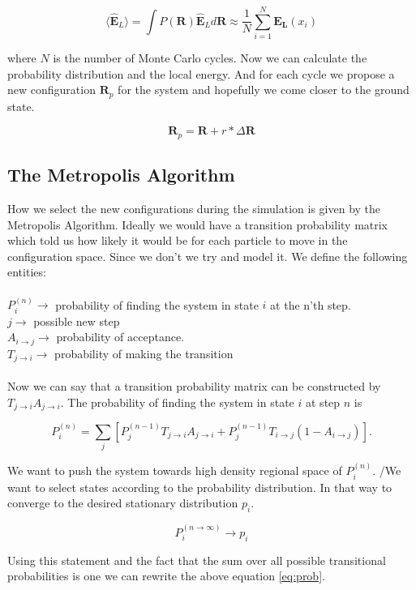 $$\langle \widehat{\mathbf{E}}_L\rangle = \int P(\mathbf{R}) \widehat{\mathbf{E}}_L d\mathbf{R} \approx \frac{1}{N} \sum_{i = 1}^N \mathbf{E_L}(x_i)$$

where $N$ is the number of Monte Carlo cycles. Now we can calculate the probability distribution and the local energy. And for each cycle we propose a new configuration $\mathbf{R}_p$ for the system and hopefully we come closer to the ground state.

$$\mathbf{R}_p = \mathbf{R} + r \ast \Delta \mathbf{R}$$

\subsection{The Metropolis Algorithm}

How we select the new configurations during the simulation is given by the Metropolis Algorithm. 
Ideally we would have a transition probability matrix which told us how likely it would be for each particle to move in the configuration space. Since we don't we try and model it.
We define the following entities:
\\
\\
$P_i^{(n)} \rightarrow$ probability of finding the system in state $i$ at the n'th step.
\\
$j \rightarrow$ possible new step
\\
$A_{i \rightarrow j} \rightarrow$ probability of acceptance. 
\\
$T_{j \rightarrow i} \rightarrow$ probability of making the transition  
\\
\\
Now we can say that a transition probability matrix can be constructed by $T_{j \rightarrow i}A_{j \rightarrow i}.$ The probability of finding the system in state $i$ at step $n$ is

\begin{equation}\label{eq:prob}
P_i^{(n)} = \sum_j \left[P_j^{(n-1)} T_{j \rightarrow i}A_{j \rightarrow i} + P_j^{(n-1)}T_{i \rightarrow j}(1 - A_{i \rightarrow j})\right].
\end{equation}

We want to push the system towards high density regional space of $P_i^{(n)}$. /We want to select states according to the probability distribution. In that way to converge to the desired stationary distribution $p_i$.

$$P_i^{(n \rightarrow \infty)} \rightarrow p_i$$

Using this statement and the fact that the sum over all possible transitional probabilities is one we can rewrite the above equation \ref{eq:prob}.

